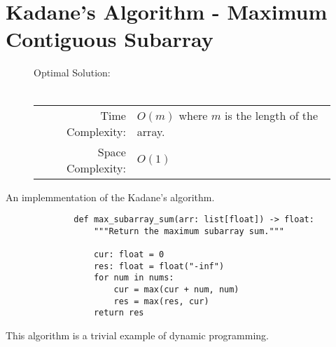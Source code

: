 
\section{Kadane's Algorithm - Maximum Contiguous Subarray}

\begin{figure}[H]
    Optimal Solution:\\\\
    \begin{tabular}{rl}
        Time Complexity:& \(O(m)\) where \(m\) is the length of the array.\\
        Space Complexity:& \(O(1)\)
    \end{tabular}
\end{figure}

An implemmentation of the Kadane's algorithm.

\begin{figure}[H]
    \centering
    \begin{verbatim}
        def max_subarray_sum(arr: list[float]) -> float:
            """Return the maximum subarray sum."""

            cur: float = 0
            res: float = float("-inf")
            for num in nums:
                cur = max(cur + num, num)
                res = max(res, cur)
            return res
    \end{verbatim}
\end{figure}

This algorithm is a trivial example of dynamic programming.
